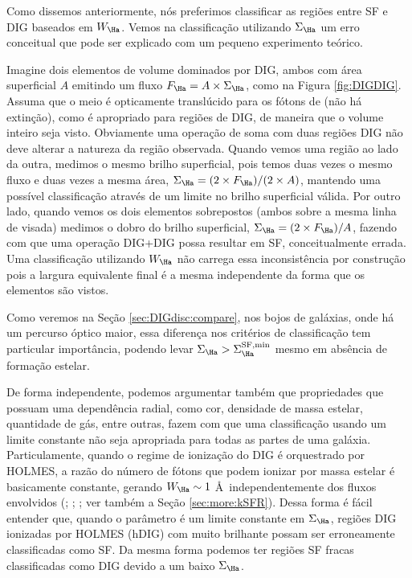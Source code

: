 Como dissemos anteriormente, nós preferimos classificar as regiões entre SF e DIG baseados em $W_{\Ha}$. Vemos na classificação utilizando $\Sigma_{\Ha}$ um erro conceitual que pode ser explicado com um pequeno experimento teórico.

Imagine dois elementos de volume dominados por DIG, ambos com área superficial $A$ emitindo um fluxo $F_{\Ha}=A\times\Sigma_{\Ha}$, como na Figura \ref{fig:DIGDIG}. Assuma que o meio é opticamente translúcido para os fótons de \Ha (não há extinção), como é apropriado para regiões de DIG, de maneira que o volume inteiro seja visto. Obviamente uma operação de soma com duas regiões DIG não deve alterar a natureza da região observada. Quando vemos uma região ao lado da outra, medimos o mesmo brilho superficial, pois temos duas vezes o mesmo fluxo e duas vezes a mesma área, $\Sigma_{\Ha}=(2 \times F_{\Ha})/(2 \times A)$, mantendo uma possível classificação através de um limite no brilho superficial válida. Por outro lado, quando vemos os dois elementos sobrepostos (ambos sobre a mesma linha de visada) medimos o dobro do brilho superficial, $\Sigma_{\Ha}=(2 \times F_{\Ha})/A$, fazendo com que uma operação DIG+DIG possa resultar em SF, conceitualmente errada.
Uma classificação utilizando $W_{\Ha}$ não carrega essa inconsistência por construção pois a largura equivalente final é a mesma independente da forma que os elementos são vistos.

Como veremos na Seção \ref{sec:DIGdisc:compare}, nos bojos de galáxias, onde há um percurso óptico maior, essa diferença nos critérios de classificação tem particular importância, podendo levar $\Sigma_{\Ha} > \Sigma_{\Ha}^{\rm SF,min}$ mesmo em absência de formação estelar.

De forma independente, podemos argumentar também que propriedades que possuam uma dependência radial, como cor, densidade de massa estelar, quantidade de gás, entre outras, fazem com que uma classificação usando um limite constante não seja apropriada para todas as partes de uma galáxia. Particulamente, quando o regime de ionização do DIG é orquestrado por HOLMES, a razão do número de fótons que podem ionizar \Ha por massa estelar é basicamente constante, gerando $W_{\Ha} \sim 1$ \AA\ independentemente dos fluxos envolvidos (\citealt{Binette.etal.1994a}; \citealt{CidFernandes.etal.2011a}; \citealt{Belfiore.etal.2016}; ver também a Seção \ref{sec:more:kSFR}). Dessa forma é fácil entender que, quando o parâmetro é um limite constante em $\Sigma_{\Ha}$, regiões DIG ionizadas por HOLMES (hDIG) com \Ha muito brilhante possam ser erroneamente classificadas como SF. Da mesma forma podemos ter regiões SF fracas classificadas como DIG devido a um baixo $\Sigma_{\Ha}$.

